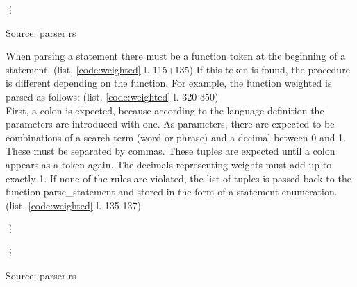 \begin{codeenv}
    \label{code:read}
    
    \vdots
    
    \centerline{Source: parser.rs}
\end{codeenv}
When parsing a statement there must be a function token at the beginning of a statement. (list. \ref{code:weighted} l. 115+135) If this token is found, the procedure is different depending on the function. For example, the function weighted is parsed as follows: (list. \ref{code:weighted} l. 320-350)\\
First, a colon is expected, because according to the language definition the parameters are introduced with one. As parameters, there are expected to be combinations of a search term (word or phrase) and a decimal between 0 and 1. These must be separated by commas. These tuples are expected until a colon appears as a token again. The decimals representing weights must add up to exactly 1. If none of the rules are violated, the list of tuples is passed back to the function parse\_statement and stored in the form of a statement enumeration. (list. \ref{code:weighted} l. 135-137)
\begin{codeenv}
    \label{code:weighted}
    
    \vdots
    
    \vdots
    
    \centerline{Source: parser.rs}
\end{codeenv}

